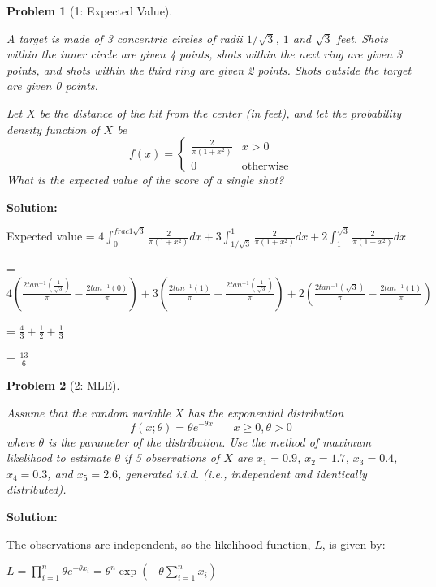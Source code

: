 \documentclass[11pt]{exam}
\theoremstyle{quest}
\newtheorem*{question}{Problem}
\begin{document}
\begin{question}[1: Expected Value]
~

A target is made of 3 concentric circles of radii $1/{\sqrt{3}}$, $1$ and
$\sqrt{3}$ feet. Shots within the inner circle are given 4 points, shots within
the next ring are given 3 points, and shots within the third ring are given 2
points. Shots outside the target are given 0 points.

Let $X$ be the distance of the hit from the center (in feet), and let the probability density function
of $X$ be
\[
f(x) =
  \begin{cases}
   \frac{2}{\pi (1+x^2)} & x>0 \\
   0 &  \text{otherwise}
  \end{cases}
\]
What is the expected value of the score of a single shot?
\end{question}
\textbf{Solution:}

Expected value = $4\int_{0}^{frac{1}{\sqrt{3}}}\frac{2}{\pi(1+x^2)}dx +  3\int_{1/\sqrt{3}}^{1}\frac{2}{\pi(1+x^2)}dx + 2\int_{1}^{\sqrt{3}}\frac{2}{\pi(1+x^2)}dx$

= $4(\frac{2tan^{-1}(\frac{1}{\sqrt{3}})}{\pi} - \frac{2tan^{-1}(0)}{\pi}) + 3(\frac{2tan^{-1}(1)}{\pi} - \frac{2tan^{-1}(\frac{1}{\sqrt{3}})}{\pi}) + 2(\frac{2tan^{-1}(\sqrt{3})}{\pi} - \frac{2tan^{-1}(1)}{\pi})$ 

= $\frac{4}{3} + \frac{1}{2} + \frac{1}{3}$

= $\frac{13}{6}$

\newpage


\begin{question}[2: MLE]
~

Assume that the random variable $X$ has the exponential distribution
\[
f(x;\theta) = \theta e^{-\theta x} \ \ \ \ \ \ \ \ x \geq 0, \theta > 0
\]
where $\theta$ is the parameter of the distribution. Use the method of maximum
likelihood to estimate $\theta$ if 5 observations of $X$ are $x_1 = 0.9$, $x_2 =
1.7$, $x_3 = 0.4$, $x_4 = 0.3$, and $x_5 = 2.6$, generated i.i.d. (i.e.,
independent and identically distributed).
\end{question}
\textbf{Solution:}

The observations are independent, so the likelihood function, $L$, is given by:

$L = \prod_{i=1}^{n} \theta e^{-\theta x_i} = \theta^n \exp(-\theta \sum_{i=1}^{n} x_i)$
\end{document}
